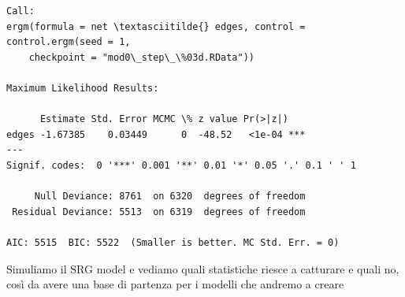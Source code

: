 \documentclass[11pt]{article}
\begin{document}
    
    \begin{Verbatim}[commandchars=\\\{\}]
Call:
ergm(formula = net \textasciitilde{} edges, control = control.ergm(seed = 1, 
    checkpoint = "mod0\_step\_\%03d.RData"))

Maximum Likelihood Results:

      Estimate Std. Error MCMC \% z value Pr(>|z|)    
edges -1.67385    0.03449      0  -48.52   <1e-04 ***
---
Signif. codes:  0 '***' 0.001 '**' 0.01 '*' 0.05 '.' 0.1 ' ' 1

     Null Deviance: 8761  on 6320  degrees of freedom
 Residual Deviance: 5513  on 6319  degrees of freedom
 
AIC: 5515  BIC: 5522  (Smaller is better. MC Std. Err. = 0)
    \end{Verbatim}

    
    Simuliamo il SRG model e vediamo quali statistiche riesce a catturare e
quali no, così da avere una base di partenza per i modelli che andremo a
creare
\end{document}
